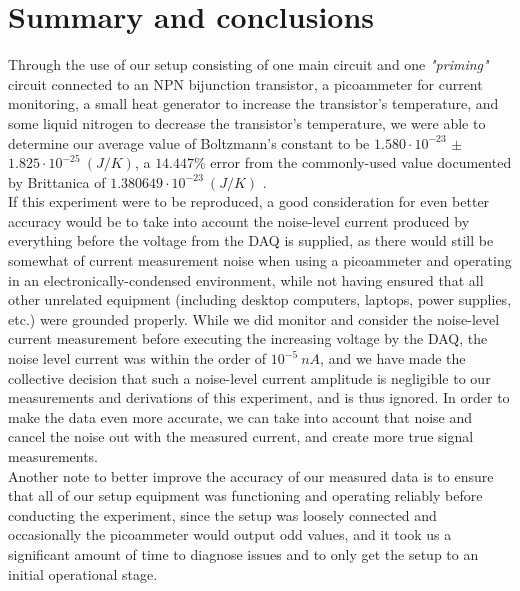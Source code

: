 \documentclass[10pt,letterpaper,onecolumn]{article}
\begin{document}
\section{Summary and conclusions}


Through the use of our setup consisting of one main circuit and one {\it "priming"} circuit connected to an NPN bijunction transistor, a picoammeter for current monitoring, a small heat generator to increase the transistor's temperature, and some liquid nitrogen to decrease the transistor's temperature, we were able to determine our average value of Boltzmann's constant to be $1.580\cdot 10^{-23}$ $\pm$ $1.825\cdot 10^{-25}\ (J/K)$, a $14.447\%$ error from the commonly-used value documented by Brittanica of $1.380649\cdot 10^{-23}\ (J/K)$ \cite{k}.\\

If this experiment were to be reproduced, a good consideration for even better accuracy would be to take into account the noise-level current produced by everything before the voltage from the DAQ is supplied, as there would still be somewhat of current measurement noise when using a picoammeter and operating in an electronically-condensed environment, while not having ensured that all other unrelated equipment (including desktop computers, laptops, power supplies, etc.) were grounded properly. While we did monitor and consider the noise-level current measurement before executing the increasing voltage by the DAQ, the noise level current was within the order of $10^{-5}\ nA$, and we have made the collective decision that such a noise-level current amplitude is negligible to our measurements and derivations of this experiment, and is thus ignored. In order to make the data even more accurate, we can take into account that noise and cancel the noise out with the measured current, and create more true signal measurements. \\

Another note to better improve the accuracy of our measured data is to ensure that all of our setup equipment was functioning and operating reliably before conducting the experiment, since the setup was loosely connected and occasionally the picoammeter would output odd values, and it took us a significant amount of time to diagnose issues and to only get the setup to an initial operational stage.

\pagebreak
\end{document}
